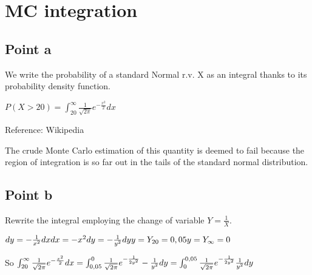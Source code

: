 \documentclass[
]{article}
\begin{document}
\hypertarget{mc-integration}{%
\section{MC integration}\label{mc-integration}}

\hypertarget{point-a-3}{%
\subsection{Point a}\label{point-a-3}}

We write the probability of a standard Normal r.v. X as an integral
thanks to its probability density function.

\(P(X>20)=\int_{20}^\infty \frac{1}{\sqrt{2\pi}} e^{-\frac{x^{2}}{2}} dx\)

Reference: Wikipedia

The crude Monte Carlo estimation of this quantity is deemed to fail
because the region of integration is so far out in the tails of the
standard normal distribution.

\hypertarget{point-b}{%
\subsection{Point b}\label{point-b}}

Rewrite the integral employing the change of variable
\(Y = \frac{1}{X}\).

\(dy=-\frac{1}{x^{2}} dx\\dx=-x^{2}dy=-\frac{1}{y^{2}}dy\\y=Y_{20}=0,05\\y=Y_\infty=0\)

So
\(\int_{20}^\infty \frac{1}{\sqrt{2\pi}} e^{-\frac{x^{2}}{2}} dx\\=\int_{0,05}^0 \frac{1}{\sqrt{2\pi}} e^{-\frac{1}{2y^{2}}} -\frac{1}{y^2} dy \\=\int_0^{0,05} \frac{1}{\sqrt{2\pi}} e^{-\frac{1}{2y^{2}}} \frac{1}{y^2} dy\)
\end{document}
